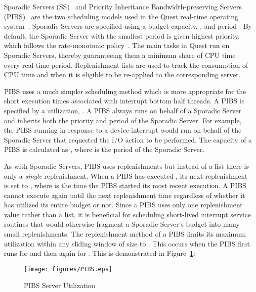 Sporadic Servers (SS)~\cite{Sprunt90} and Priority Inheritance
Bandwidth-preserving Servers (PIBS)~\cite{DanishLiWe11} are the two scheduling
models used in the Quest real-time operating system~\cite{quest-webpage}.
Sporadic Servers are specified using a budget capacity, , and period
. By default, the Sporadic Server with the smallest period is given highest
priority, which follows the rate-monotonic policy~\cite{LiuLa73}. The main
tasks in Quest run on Sporadic Servers, thereby guaranteeing them a minimum
share of CPU time every real-time period.  Replenishment lists are used to
track the consumption of CPU time and when it is eligible to be re-applied to
the corresponding server.

PIBS uses a much simpler scheduling method which is more appropriate for the
short execution times associated with interrupt bottom half threads.  A PIBS
is specified by a utilization, .  A PIBS always runs on behalf of a
Sporadic Server and inherits both the priority and period of the Sporadic
Server.  For example, the PIBS running in response to a device interrupt would
run on behalf of the Sporadic Server that requested the I/O action to be
performed.  The capacity of a PIBS is calculated as , where
 is the period of the Sporadic Server.

As with Sporadic Servers, PIBS uses replenishments but instead of a list there
is only a {\em single} replenishment.  When a PIBS has executed
, its next replenishment is set to ,
where  is the time the PIBS started its most recent execution.  A PIBS cannot
execute again until the next replenishment time regardless of whether it has
utilized its entire budget or not. Since a PIBS uses only one replenishment
value rather than a list, it is beneficial for scheduling short-lived interrupt
service routines that would otherwise fragment a Sporadic Server's budget into
many small replenishments. The replenishment method of a PIBS limits its maximum
utilization within any sliding window of size  to .  This
occurs when the PIBS first runs for  and then again for
.  This is demonstrated in Figure~\ref{fig:PIBS}:



\begin{figure}[h]
  \centering
  \texttt{[image: figures/PIBS.eps]}
  \caption{PIBS Server Utilization}
  \label{fig:PIBS}
\end{figure}

